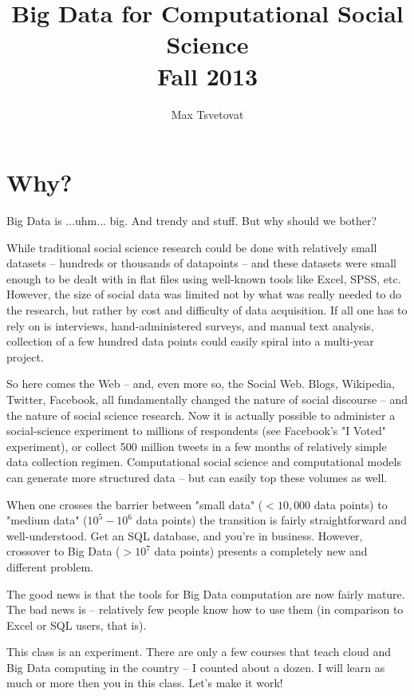 \documentclass[12pt]{article}
\title{Big Data for Computational Social Science\\Fall 2013}
\author{Max Tsvetovat}
\begin{document}
\maketitle

\section{Why?}

Big Data is ...uhm... big. And trendy and stuff. But why should we bother?

While traditional social science research could be done with relatively small datasets -- hundreds or thousands of datapoints -- and these datasets were small enough to be dealt with in flat files using well-known tools like Excel, SPSS, etc. However, the size of social data was limited not by what was really needed to do the research, but rather by cost and difficulty of data acquisition. If all one has to rely on is interviews, hand-administered surveys, and manual text analysis, collection of a few hundred data points could easily spiral into a multi-year project.

So here comes the Web -- and, even more so, the Social Web. Blogs, Wikipedia, Twitter, Facebook, all fundamentally changed the nature of social discourse -- and the nature of social science research. Now it is actually possible to administer a social-science experiment to millions of respondents (see Facebook's "I Voted" experiment), or collect 500 million tweets in a few months of relatively simple data collection regimen. Computational social science and computational models can generate more structured data -- but can easily top these volumes as well.

When one crosses the barrier between "small data" ($< 10,000$ data points) to "medium data" ($10^5-10^6$ data points) the transition is fairly straightforward and well-understood. Get an SQL database, and you're in business. However, crossover to Big Data ($>10^7$ data points) presents a completely new and different problem. 

The good news is that the tools for Big Data computation are now fairly mature. The bad news is -- relatively few people know how to use them (in comparison to Excel or SQL users, that is).

This class is an experiment. There are only a few courses that teach cloud and Big Data computing in the country -- I counted about a dozen. I will learn as much or more then you in this class. Let's make it work!
\end{document}
